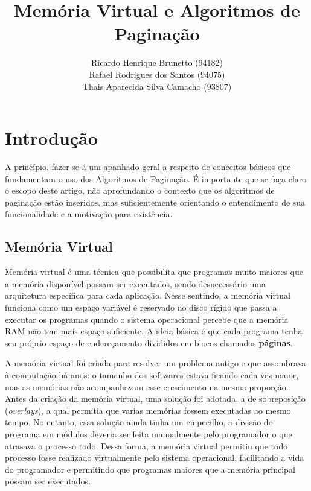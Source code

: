 
\sloppy

\title{Memória Virtual e Algoritmos de Paginação}

\author{Ricardo Henrique Brunetto (94182)\\
				Rafael Rodrigues dos Santos (94075)\\
				Thais Aparecida Silva Camacho (93807)}

\address{Departamento de Informática -- Universidade Estadual de Maringá (UEM)\\
	Maringá -- PR -- Brasil
}



\maketitle

{}

\section{Introdução}

A princípio, fazer-se-á um apanhado geral a respeito de conceitos básicos que fundamentam o uso dos Algoritmos de Paginação. É importante que se faça claro o escopo deste artigo, não aprofundando o contexto que os algoritmos de paginação estão inseridos, mas suficientemente orientando o entendimento de sua funcionalidade e a motivação para existência.

\subsection{Memória Virtual}\label{sec:memvir}

Memória virtual é uma técnica que possibilita que programas muito maiores que a memória disponível possam ser executados, sendo desnecessário uma arquitetura específica para cada aplicação. Nesse sentindo, a memória virtual funciona como um espaço variável é reservado no disco rígido que passa a executar os programas quando o sistema operacional percebe que a memória RAM não tem mais espaço suficiente. A ideia básica é que cada programa tenha seu próprio espaço de endereçamento divididos em blocos chamados \textbf{páginas}.

A memória virtual foi criada para resolver um problema antigo e que assombrava à computação há anos: o tamanho dos softwares estava ficando cada vez maior, mas as memórias não acompanhavam esse crescimento na mesma proporção.
Antes da criação da memória virtual, uma solução foi adotada, a de sobreposição (\textit{overlays}), a qual permitia que varias memórias fossem executadas ao mesmo tempo. No entanto, essa solução ainda tinha um empecilho, a divisão do programa em módulos deveria ser feita manualmente pelo programador o que atrasava o processo todo. Dessa forma, a memória virtual permitiu que todo processo fosse realizado virtualmente pelo sistema operacional, facilitando a vida do programador e permitindo que programas maiores que a memória principal possam ser executados.

